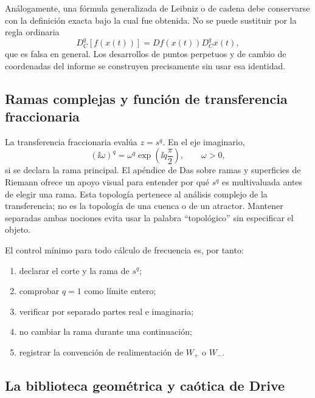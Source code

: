 Análogamente, una fórmula generalizada de Leibniz o de cadena debe conservarse
con la definición exacta bajo la cual fue obtenida. No se puede sustituir por
la regla ordinaria
\[
 D_C^q[f(x(t))]=Df(x(t))D_C^q x(t),
\]
que es falsa en general. Los desarrollos de puntos perpetuos y de cambio de
coordenadas del informe se construyen precisamente sin usar esa identidad.

\subsection{Ramas complejas y función de transferencia fraccionaria}

La transferencia fraccionaria evalúa \(z=s^q\). En el eje imaginario,
\begin{equation}
 (\ii\omega)^q
 =\omega^q\exp\!\left(\ii q\frac{\pi}{2}\right),
 \qquad \omega>0,
 \label{eq:library-principal-branch}
\end{equation}
si se declara la rama principal. El apéndice de Das sobre ramas y superficies
de Riemann ofrece un apoyo visual para entender por qué \(s^q\) es multivaluada
antes de elegir una rama. Esta topología pertenece al análisis complejo de la
transferencia; no es la topología de una cuenca o de un atractor. Mantener
separadas ambas nociones evita usar la palabra ``topológico'' sin especificar
el objeto.

El control mínimo para todo cálculo de frecuencia es, por tanto:
\begin{enumerate}
 \item declarar el corte y la rama de \(s^q\);
 \item comprobar \(q=1\) como límite entero;
 \item verificar por separado partes real e imaginaria;
 \item no cambiar la rama durante una continuación;
 \item registrar la convención de realimentación de \(W_+\) o \(W_-\).
\end{enumerate}

\subsection{La biblioteca geométrica y caótica de Drive}

